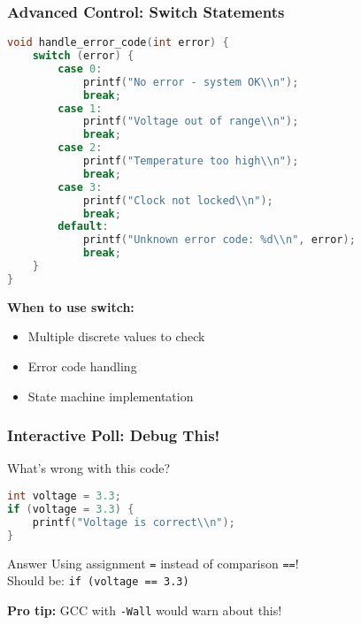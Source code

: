 \documentclass{beamer}
\begin{document}
\begin{frame}[fragile]
\frametitle{Advanced Control: Switch Statements}
\begin{lstlisting}[language=C]
void handle_error_code(int error) {
    switch (error) {
        case 0:
            printf("No error - system OK\\n");
            break;
        case 1:
            printf("Voltage out of range\\n");
            break;
        case 2:
            printf("Temperature too high\\n");
            break;
        case 3:
            printf("Clock not locked\\n");
            break;
        default:
            printf("Unknown error code: %d\\n", error);
            break;
    }
}
\end{lstlisting}

\textbf{When to use switch:}
\begin{itemize}
    \item Multiple discrete values to check
    \item Error code handling
    \item State machine implementation
\end{itemize}
\end{frame}

\begin{frame}[fragile]
\frametitle{Interactive Poll: Debug This!}
\begin{center}
\Large What's wrong with this code?
\end{center}

\begin{lstlisting}[language=C]
int voltage = 3.3;
if (voltage = 3.3) {
    printf("Voltage is correct\\n");
}
\end{lstlisting}

\pause

\begin{alertblock}{Answer}
Using assignment \texttt{=} instead of comparison \texttt{==}!\\
Should be: \texttt{if (voltage == 3.3)}
\end{alertblock}

\vspace{0.5cm}
\textbf{Pro tip:} GCC with \texttt{-Wall} would warn about this!
\end{frame}
\end{document}
